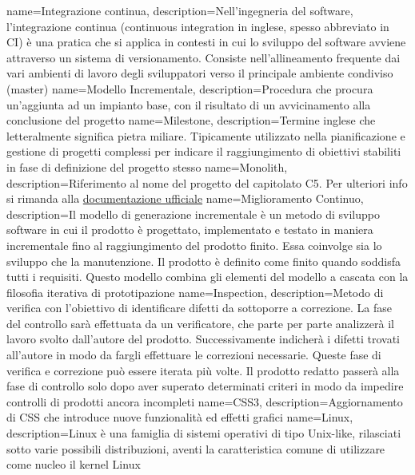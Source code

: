  {
	name=Integrazione continua,
	description={Nell'ingegneria del software, l'integrazione continua (continuous integration in inglese, spesso abbreviato in CI) è una pratica che si applica in contesti in cui lo sviluppo del software avviene attraverso un sistema di versionamento. Consiste nell'allineamento frequente dai vari ambienti di lavoro degli sviluppatori verso il principale ambiente condiviso (master)}
}
 {
	name=Modello Incrementale,
	description={Procedura che procura un'aggiunta ad un impianto base, con il risultato di un avvicinamento alla conclusione del progetto}
}
 {
	name=Milestone,
	description={Termine inglese che letteralmente significa pietra miliare. Tipicamente utilizzato nella pianificazione e gestione di progetti complessi per indicare il raggiungimento di obiettivi stabiliti in fase di definizione del progetto stesso}
}
 {
	name=Monolith,
	description={Riferimento al nome del progetto del capitolato C5. Per ulteriori info si rimanda alla \href{http://www.math.unipd.it/~tullio/IS-1/2016/Progetto/C5.pdf}{documentazione ufficiale}}
}
 {
	name=Miglioramento Continuo,
	description={Il modello di generazione incrementale è un metodo di sviluppo software in cui il prodotto è progettato, implementato e testato in maniera incrementale fino al raggiungimento del prodotto finito. Essa coinvolge sia lo sviluppo che la manutenzione. Il prodotto è definito come finito quando soddisfa tutti i requisiti. Questo modello combina gli elementi del modello a cascata con la filosofia iterativa di prototipazione}
}
 {
	name=Inspection,
	description={Metodo di verifica con l'obiettivo di identificare difetti da sottoporre a correzione. La fase del controllo sarà effettuata da un verificatore, che parte per parte analizzerà il lavoro svolto dall'autore del prodotto. Successivamente indicherà i difetti trovati all'autore in modo da fargli effettuare le correzioni necessarie. Queste fase di verifica e correzione può essere iterata più volte. 
	Il prodotto redatto passerà alla fase di controllo solo dopo aver superato determinati criteri in modo da impedire controlli di prodotti ancora incompleti}
}
 {
	name=CSS3,
	description={Aggiornamento di CSS che introduce nuove funzionalità ed effetti grafici} 
}
 {
	name=Linux,
	description={Linux è una famiglia di sistemi operativi di tipo Unix-like, rilasciati sotto varie possibili distribuzioni, aventi la caratteristica comune di utilizzare come nucleo il kernel Linux}
}
